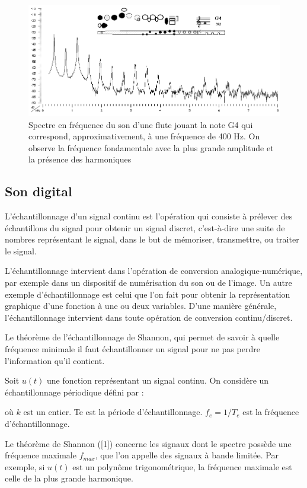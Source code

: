 \documentclass[conference,onecolumn]{IEEEtran}
\begin{document}
 \begin{figure}[H]
 \centering
    \includegraphics[scale=0.5]{img4.png}
    \caption{Spectre en fréquence du son d'une flute jouant la note G4 qui correspond, approximativement, à une fréquence de 400 Hz. On observe la fréquence fondamentale avec la plus grande amplitude et la présence des harmoniques}
\end{figure}

\subsection{Son digital}

L'échantillonnage d'un signal continu est l'opération qui consiste à prélever des échantillons du signal pour obtenir un signal discret, c'est-à-dire une suite de nombres représentant le signal, dans le but de mémoriser, transmettre, ou traiter le signal. 

L'échantillonnage intervient dans l'opération de conversion analogique-numérique, par exemple dans un dispositif de numérisation du son ou de l'image. Un autre exemple d'échantillonnage est celui que l'on fait pour obtenir la représentation graphique d'une fonction à une ou deux variables. D'une manière générale, l'échantillonnage intervient dans toute opération de conversion continu/discret. 

Le théorème de l'échantillonnage de Shannon, qui permet de savoir à quelle fréquence minimale il faut échantillonner un signal pour ne pas perdre l'information qu'il contient. 

Soit $u(t)$ une fonction représentant un signal continu. On considère un échantillonnage périodique défini par : 

où $k$ est un entier. Te est la période d'échantillonnage. $f_e=1/T_e$ est la fréquence d'échantillonnage. 

Le théorème de Shannon ([1]) concerne les signaux dont le spectre possède une fréquence maximale $f_{max}$, que l'on appelle des signaux à bande limitée. Par exemple, si $u(t)$ est un polynôme trigonométrique, la fréquence maximale est celle de la plus grande harmonique.
\end{document}
